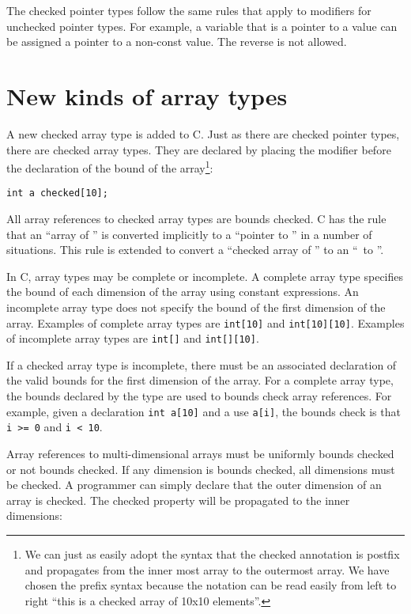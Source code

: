 The checked pointer types follow the same rules that apply to modifiers for
unchecked pointer types.  For example, a variable that is a pointer to a
 value can be assigned a pointer to a non-const value.  
The reverse is not allowed.

\section{New kinds of array types}

A new checked array type is added to C. Just as there are checked pointer
types, there are checked array types. They are declared by placing the
modifier  before the declaration of the bound of the
array\footnote{We can just as easily adopt the syntax that the checked
annotation is postfix and propagates from the inner most array to the
 outermost array. We have chosen the prefix syntax because the notation
 can be read easily from left to right ``this is a checked array of
 10x10 elements''.}:
\begin{verbatim}
int a checked[10];
\end{verbatim}

All array references to checked array types are bounds checked. C has
the rule that an ``array of '' is converted implicitly to a
``pointer to '' in a number of situations. This rule is extended
to convert a ``checked array of '' to an ``\arrayptr\ 
to ''.

In C, array types may be complete or incomplete. A complete array type
specifies the bound of each dimension of the array using constant
expressions. An incomplete array type does not specify the bound of the
first dimension of the array. Examples of complete array types are
\texttt{int[10]} and \texttt{int[10][10]}. Examples of
incomplete array types are \texttt{int[]} and \texttt{int[][10]}.

If a checked array type is incomplete, there must be an associated
declaration of the valid bounds for the first dimension of the array.
For a complete array type, the bounds declared by the type are used to
bounds check array references. For example, given a declaration
\texttt{int a[10]} and a use \texttt{a[i]}, the bounds check is
that \texttt{i >= 0} and \texttt{i < 10}.

Array references to multi-dimensional arrays must be uniformly bounds
checked or not bounds checked. If any dimension is bounds checked, all
dimensions must be checked. A programmer can simply declare that
the outer dimension of an array is checked.  The checked property will be 
propagated to the inner dimensions:

